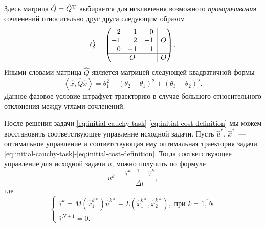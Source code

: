 \documentclass[../../doc.tex]{subfiles}
\begin{document}
    Здесь матрица $\hat Q = \hat Q^\textnormal{T}$ выбирается для исключения возможного \textit{проворачивания} сочленений относительно друг друга следующим образом
    \begin{equation}\label{eq:initial-phase-definition}
        \hat Q
        =
        \begin{pmatrix}
                \begin{matrix}
                    \hphantom{-}2 & -1            & \hphantom{-}0 \\
                    -1            & \hphantom{-}2 & -1            \\
                    \hphantom{-}0 & -1            & \hphantom{-}1
                \end{matrix}
                & \hspace*{-\arraycolsep}\vline\hspace*{-\arraycolsep} &
                O
            \\\hline
                O
                & \hspace*{-\arraycolsep}\vline\hspace*{-\arraycolsep} &
                O
        \end{pmatrix}
        .
    \end{equation}
    Иными словами матрица $\hat Q$ является матрицей следующей квадратичной формы
    \begin{equation*}
        \left\langle
            \hat x, \hat Q \hat x
        \right\rangle
        =
        \theta_1^2 + (\theta_2 - \theta_1)^2 + (\theta_3 - \theta_2)^2.
    \end{equation*}
    Данное фазовое условие штрафует траекторию в случае большого относительного отклонения между углами сочленений.

    После решения задачи \eqref{eq:initial-cauchy-task}-\eqref{eq:initial-cost-definition} мы можем восстановить соответствующее управление исходной задачи.
    Пусть $\hat u^{*}$, $\hat x^{*}$~--- оптимальное управление и соответствующая ему оптимальная траектория задачи \eqref{eq:initial-cauchy-task}-\eqref{eq:initial-cost-definition}.
    Тогда соответствующее управление для исходной задачи $u$, можно получить по формуле
    \begin{equation}\label{eq:initial-control-translate}
        u^{k} = \frac{\hat \tau^{k+1} - \hat \tau^{k}}{\Delta t},
    \end{equation}
    где
    \begin{equation*}
        \begin{cases}
            \hat \tau^k = M(\hat x_1^{k*})\hat u^{k*} + L(\hat x_1^{k*}, \hat x_2^{k*}), \mbox{ при } k=\overline{1, N}
            \\
            \hat \tau^{N+1} = 0.
        \end{cases}
    \end{equation*}
\end{document}
